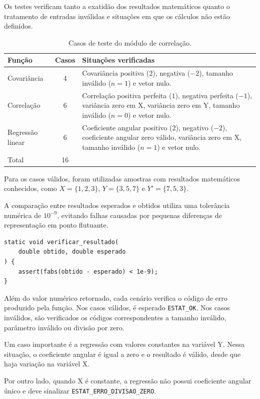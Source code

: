 \documentclass[12pt,a4paper]{article}
\newcommand{\cod}[1]{\texttt{#1}}
\begin{document}
Os testes verificam tanto a exatidão dos resultados matemáticos
quanto o tratamento de entradas inválidas e situações em que
os cálculos não estão definidos.

\begin{table}[h]
\centering
\small
\begin{tabular}{@{}lcp{8cm}@{}}
\toprule
Função & Casos & Situações verificadas \\
\midrule
Covariância & 4 &
Covariância positiva ($2$), negativa ($-2$),
tamanho inválido ($n=1$) e vetor nulo. \\

Correlação & 6 &
Correlação positiva perfeita ($1$), negativa
perfeita ($-1$), variância zero em X, variância
zero em Y, tamanho inválido ($n=0$) e vetor nulo. \\

Regressão linear & 6 &
Coeficiente angular positivo ($2$), negativo
($-2$), coeficiente angular zero válido,
variância zero em X, tamanho inválido ($n=1$)
e vetor nulo. \\
\midrule
Total & 16 & \\
\bottomrule
\end{tabular}
\caption{Casos de teste do módulo de correlação.}
\end{table}

Para os casos válidos, foram utilizadas amostras com
resultados matemáticos conhecidos, como
$X=\{1,2,3\}$, $Y=\{3,5,7\}$ e
$Y'=\{7,5,3\}$.

A comparação entre resultados esperados e obtidos utiliza
uma tolerância numérica de $10^{-9}$, evitando falhas
causadas por pequenas diferenças de representação
em ponto flutuante.

\begin{lstlisting}
static void verificar_resultado(
    double obtido, double esperado
) {
    assert(fabs(obtido - esperado) < 1e-9);
}
\end{lstlisting}

Além do valor numérico retornado, cada cenário verifica
o código de erro produzido pela função. Nos casos válidos,
é esperado \cod{ESTAT\_OK}. Nos casos inválidos, são
verificados os códigos correspondentes a tamanho inválido,
parâmetro inválido ou divisão por zero.

Um caso importante é a regressão com valores constantes
na variável Y. Nessa situação, o coeficiente angular
é igual a zero e o resultado é válido, desde que haja
variação na variável X.

Por outro lado, quando X é constante, a regressão não
possui coeficiente angular único e deve sinalizar
\cod{ESTAT\_ERRO\_DIVISAO\_ZERO}.
\end{document}
